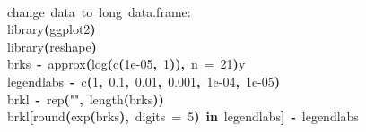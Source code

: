 \documentclass[a4paper]{article}
\newcommand{\hlnumber}[1]{\textcolor[rgb]{0.0823529411764706,0.0784313725490196,0.709803921568627}{#1}}%
\newcommand{\hlfunctioncall}[1]{\textcolor[rgb]{1,0,0}{#1}}%
\newcommand{\hlstring}[1]{\textcolor[rgb]{0.6,0.6,1}{#1}}%
\newcommand{\hlkeyword}[1]{\textcolor[rgb]{0,0,0}{\textbf{#1}}}%
\newcommand{\hlargument}[1]{\textcolor[rgb]{0.694117647058824,0.247058823529412,0.0196078431372549}{#1}}%
\newcommand{\hlcomment}[1]{\textcolor[rgb]{0.8,0.8,0.8}{#1}}%
\newcommand{\hlassignement}[1]{\textcolor[rgb]{0.215686274509804,0.215686274509804,0.384313725490196}{\textbf{#1}}}%
\newcommand{\hlsymbol}[1]{\textcolor[rgb]{0,0,0}{#1}}%
\newcommand{\hlprompt}[1]{\textcolor[rgb]{0,0,0}{#1}}%
\newcommand{\hlstd}[1]{\textcolor[rgb]{0,0,0}{#1}}%
\newenvironment{Houtput}{\raggedright}{%
%
}
\begin{document}
\begin{Houtput}
\hspace*{\fill}\\
\hlstd{}\ttfamily\noindent
\hlprompt{\usebox{\hlnormalsizeboxgreaterthan}{\ }}\hlcomment{\usebox{\hlnormalsizeboxhash}{\ }change{\ }data{\ }to{\ }long{\ }data.frame:}\mbox{}
\normalfont
\hspace*{\fill}\\
\hlstd{}\ttfamily\noindent
\hlprompt{\usebox{\hlnormalsizeboxgreaterthan}{\ }}\hlfunctioncall{library}\hlkeyword{(}\hlsymbol{ggplot2}\hlkeyword{)}\mbox{}
\normalfont
\hspace*{\fill}\\
\hlstd{}\ttfamily\noindent
\hlprompt{\usebox{\hlnormalsizeboxgreaterthan}{\ }}\hlfunctioncall{library}\hlkeyword{(}\hlsymbol{reshape}\hlkeyword{)}\mbox{}
\normalfont
\hspace*{\fill}\\
\hlstd{}\ttfamily\noindent
\hlprompt{\usebox{\hlnormalsizeboxgreaterthan}{\ }}\hlsymbol{brks}{\ }\hlassignement{\usebox{\hlnormalsizeboxlessthan}-}{\ }\hlfunctioncall{approx}\hlkeyword{(}\hlfunctioncall{log}\hlkeyword{(}\hlfunctioncall{c}\hlkeyword{(}\hlnumber{1e-05}\hlkeyword{,}{\ }\hlnumber{1}\hlkeyword{)}\hlkeyword{)}\hlkeyword{,}{\ }\hlargument{n}{\ }\hlargument{=}{\ }\hlnumber{21}\hlkeyword{)}\hlkeyword{\usebox{\hlnormalsizeboxdollar}}\hlsymbol{y}\mbox{}
\normalfont
\hspace*{\fill}\\
\hlstd{}\ttfamily\noindent
\hlprompt{\usebox{\hlnormalsizeboxgreaterthan}{\ }}\hlsymbol{legendlabs}{\ }\hlassignement{\usebox{\hlnormalsizeboxlessthan}-}{\ }\hlfunctioncall{c}\hlkeyword{(}\hlnumber{1}\hlkeyword{,}{\ }\hlnumber{0.1}\hlkeyword{,}{\ }\hlnumber{0.01}\hlkeyword{,}{\ }\hlnumber{0.001}\hlkeyword{,}{\ }\hlnumber{1e-04}\hlkeyword{,}{\ }\hlnumber{1e-05}\hlkeyword{)}\mbox{}
\normalfont
\hspace*{\fill}\\
\hlstd{}\ttfamily\noindent
\hlprompt{\usebox{\hlnormalsizeboxgreaterthan}{\ }}\hlsymbol{brkl}{\ }\hlassignement{\usebox{\hlnormalsizeboxlessthan}-}{\ }\hlfunctioncall{rep}\hlkeyword{(}\hlstring{""}\hlkeyword{,}{\ }\hlfunctioncall{length}\hlkeyword{(}\hlsymbol{brks}\hlkeyword{)}\hlkeyword{)}\mbox{}
\normalfont
\hspace*{\fill}\\
\hlstd{}\ttfamily\noindent
\hlprompt{\usebox{\hlnormalsizeboxgreaterthan}{\ }}\hlsymbol{brkl}\hlkeyword{[}\hlfunctioncall{round}\hlkeyword{(}\hlfunctioncall{exp}\hlkeyword{(}\hlsymbol{brks}\hlkeyword{)}\hlkeyword{,}{\ }\hlargument{digits}{\ }\hlargument{=}{\ }\hlnumber{5}\hlkeyword{)}{\ }\hlkeyword{\usebox{\hlnormalsizeboxpercent}in\usebox{\hlnormalsizeboxpercent}}{\ }\hlsymbol{legendlabs}\hlkeyword{]}{\ }\hlassignement{\usebox{\hlnormalsizeboxlessthan}-}{\ }\hlsymbol{legendlabs}\mbox{}

\end{Houtput}
\end{document}
